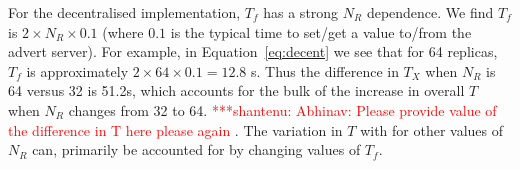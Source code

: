 \documentclass{rspublic}
\newcommand{\jhanote}[1]{ {\textcolor{red} { ***shantenu: #1 }}}
\newcommand{\alnote}[1]{ {\textcolor{blue} { ***andre: #1 }}}
\newcommand{\alnote}[1]{}
\newcommand{\jhanote}[1]{}
\begin{document}




For the decentralised implementation, $T_f$ has a strong $N_R$
dependence. We find $T_f$ is $2 \times N_R \times 0.1$ (where $0.1$ is
the typical time to set/get a value to/from the advert server).  For
example, in Equation~\ref{eq:decent} we see that for 64 replicas,
$T_f$ is approximately $2 \times 64 \times 0.1 = 12.8$ s.  Thus the
difference in $T_X$ when $N_R$ is 64 versus 32 is 51.2s, which
accounts for the bulk of the increase in overall $T$ when $N_R$
changes from 32 to 64. \jhanote{Abhinav: Please provide value of the
  difference in T here please again}. The variation in $T$ with for
other values of $N_R$ can, primarily be accounted for by changing
values of $T_f$.
\end{document}
